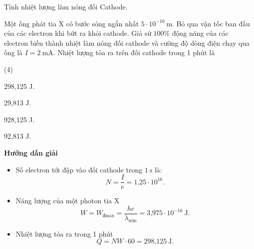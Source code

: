 \begin{dang}{Tính nhiệt lượng làm nóng đối Cathode.}


{Một ống phát tia X có bước sóng ngắn nhất $5\cdot 10^{-10}\ \text{m}$. Bỏ qua vận tốc ban đầu của các electron khi bứt ra khỏi cathode. Giả sử $100\%$ động năng của các electron biến thành nhiệt làm nóng đối cathode và cường độ dòng điện chạy qua ống là $I = 2\ \text{mA}$. Nhiệt lượng tỏa ra trên đối cathode trong 1 phút là 
\begin{mcq}(4)
\item 298,125 J.
\item 29,813 J.
\item 928,125 J.
\item 92,813 J.
\end{mcq}
}
{\begin{center}
	\textbf{Hướng dẫn giải}
\end{center}

\begin{itemize}
	\item Số electron tới đập vào đối cathode trong $1\ \text{s}$ là:
	\begin{equation*}
		N=\dfrac{I}{e} = \text{1,25} \cdot 10^{16}.
	\end{equation*}
	\item Năng lượng của một photon tia X 
	\begin{equation*}
		W=W_{\text{đmax}}=\dfrac{hc}{\lambda_{\text{min}}}=\text{3,975} \cdot 10^{-16}\ \text{J}.
	\end{equation*}
	\item Nhiệt lượng tỏa ra trong 1 phút
	\begin{equation*}
	Q=NW \cdot 60 = \text{298,125}\ \text{J}.
	\end{equation*}
\end{itemize}

}
\end{dang}
